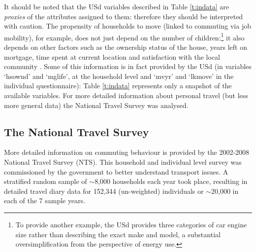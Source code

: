 It should be noted that the USd variables described in Table \ref{t:indata} are
\emph{proxies} of the attributes assigned to them: therefore they should be
interpreted with caution. The propensity of households to move (linked to
commuting via job mobility), for example, does not just depend on the number of
children:\footnote{To
provide another
example, the USd provides three categories of car engine size rather than
describing the exact make and model, a substantial oversimplification from the
perspective of energy use.
}
 it also depends on other factors such as the ownership status of the house,
years left on mortgage, time spent at current location and satisfaction with the
local community \citep{Charlotta2011}. Some of this information is in fact
provided by the USd (in variables `hsownd' and `mglife', at the household level
and `mvyr' and `lkmove' in the individual questionnaire): Table \ref{t:indata}
represents only a snapshot of the available variables. For more detailed
information about personal travel (but less more general data) the
National Travel Survey was analysed.

\subsection{The National Travel Survey} 
\label{snts}
More detailed information on commuting behaviour is provided by the 2002-2008
National Travel Survey (NTS). This household and individual level survey was
commissioned by the government to better understand transport issues. A
stratified random sample of $\sim$8,000 households each year took place,
resulting in detailed travel diary data for 152,344 (un-weighted) individuals
or $\sim$20,000 in each of the 7 sample years.

